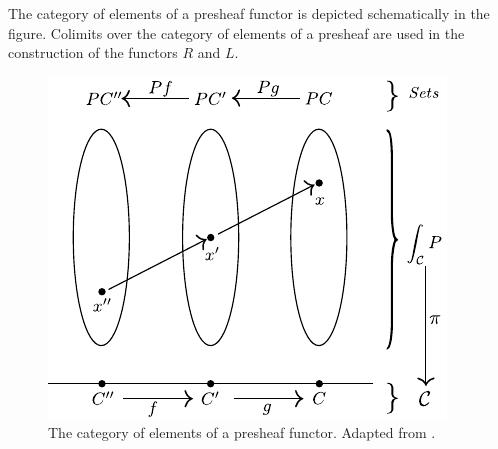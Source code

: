 \begin{frame}
The category of elements of a presheaf functor is depicted schematically in the figure. Colimits over the category of elements of a presheaf are used in the construction of the functors $R$ and $L$.
\begin{figure}
\noindent\includegraphics[width=0.6\framewidth]{fig/catofel.pdf}
\caption{The category of elements of a presheaf functor. Adapted from \cite{Awodey2006}.}
\label{fig:catofel}
\end{figure}
\end{frame}
